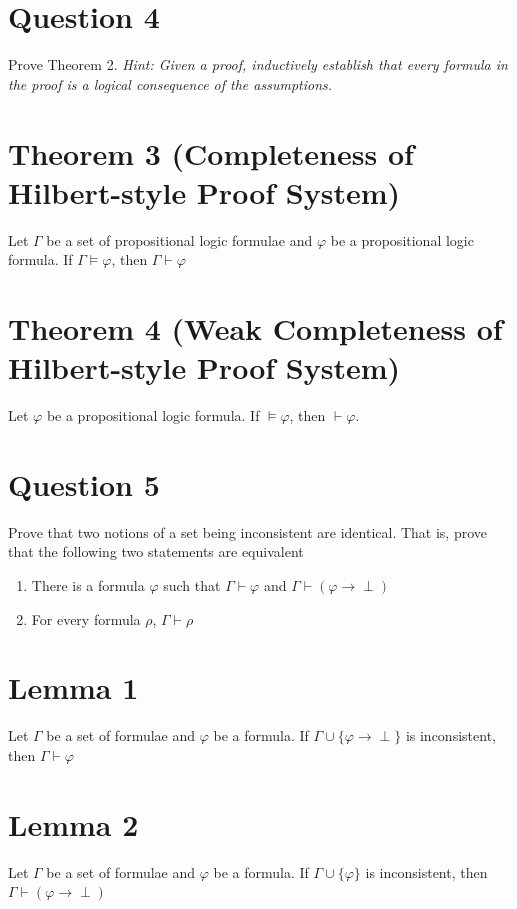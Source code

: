 \documentclass{article}
\begin{document}
\section*{Question 4}
Prove Theorem 2. \textit{Hint: Given a proof, inductively establish that every formula in the proof is a logical consequence of the assumptions.}

\section*{Theorem 3 (Completeness of Hilbert-style Proof System)}
Let $\Gamma$ be a set of propositional logic formulae and $\varphi$ be a propositional logic formula. If $\Gamma \models \varphi$, then $\Gamma \vdash \varphi$

\section*{Theorem 4 (Weak Completeness of Hilbert-style Proof System)}
Let $\varphi$ be a propositional logic formula. If $\models \varphi$, then $\vdash \varphi$.

\section*{Question 5}
Prove that two notions of a set being inconsistent are identical. That is, prove that the following two statements are equivalent
\begin{enumerate}
    \item There is a formula $\varphi$ such that $\Gamma \vdash \varphi$ and $\Gamma \vdash (\varphi \rightarrow \perp)$
    \item For every formula $\rho$, $\Gamma \vdash \rho$
\end{enumerate}

\section*{Lemma 1}
Let $\Gamma$ be a set of formulae and $\varphi$ be a formula. If $\Gamma \cup \{\varphi \rightarrow \perp\}$ is inconsistent, then $\Gamma \vdash \varphi$

\section*{Lemma 2}
Let $\Gamma$ be a set of formulae and $\varphi$ be a formula. If $\Gamma \cup \{\varphi\}$ is inconsistent, then $\Gamma \vdash (\varphi \rightarrow \perp)$
\end{document}
